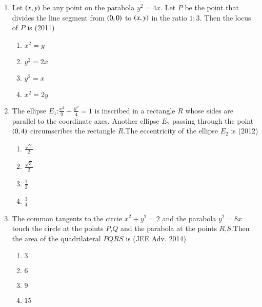 \documentclass[journal,12pt,onecolumn]{IEEEtran}
\theoremstyle{remark}
\begin{document}
\begin{enumerate}
	\item Let $\left(x,y\right)$ be any point on the parabola $y^2=4x$. Let $P$ be the point that divides the line segment from $\left(0,0\right)$ to $\left(x,y\right)$ in the ratio $1:3$. Then the locus of $P$ is  \hfill(2011)\\
		\begin{enumerate}
			\item $x^2=y$
			\item $y^2=2x$
			\item $y^2=x$
			\item $x^2=2y$
		\end{enumerate}

	\item The ellipse $E_{1}$:$\frac{x^2}{9}+\frac{y^2}{4}=1$ is inscribed in a rectangle $R$ whose sides are parallel to the coordinate axes. Another ellipse $E_{2}$ passing through the point $\left(0,4\right)$ circumscribes the rectangle $R$.The eccentricity of the ellipse $E_{2}$ is \hfill(2012)\\

		\begin{enumerate}
			\item $\frac{\sqrt{2}}{2}$
			\item $\frac{\sqrt{3}}{2}$
			\item $\frac{1}{2}$
			\item $\frac{3}{4}$
		\end{enumerate}

	\item The common tangents to the circie $x^2+y^2=2$ and the parabola $y^2=8x$ touch the circle at the points $P$,$Q$ and the parabola at the points $R$,$S$.Then the area of the quadrilateral $PQRS$ is \hfill(JEE Adv. 2014)\\
		\begin{enumerate}
			\item $3$
			\item $6$
			\item $9$
			\item $15$
		\end{enumerate}
		\vspace{0.5cm}
\end{enumerate}
\end{document}
